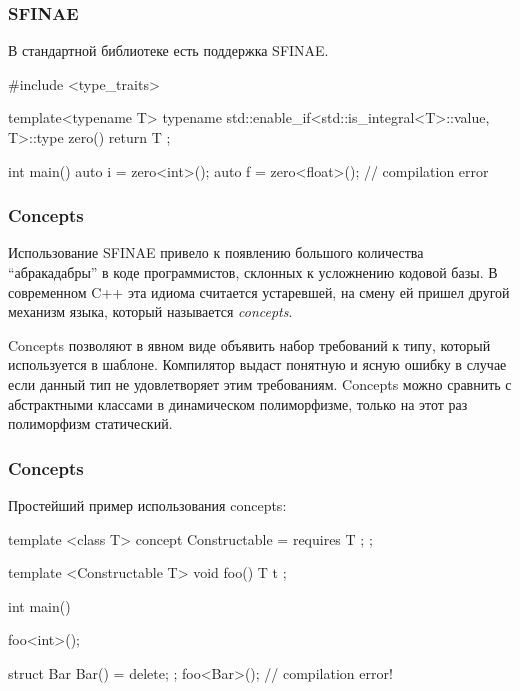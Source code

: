 \documentclass[compress, 8pt, aspectratio=169]{beamer}
\begin{document}
  \begin{frame}[fragile]

    \frametitle{SFINAE}

    В стандартной библиотеке есть поддержка\footnotemark{} SFINAE.


    \begin{myinplacelisting}[minted language=cpp]
#include <type_traits>

template<typename T>
typename std::enable_if<std::is_integral<T>::value, T>::type
zero() {
    return T {};
}

int main() {
    auto i = zero<int>();
    auto f = zero<float>(); // compilation error
}
    \end{myinplacelisting}

  \end{frame}

  \begin{frame}[fragile]

    \frametitle{Concepts}

    Использование SFINAE привело к появлению большого
    количества \enquote{абракадабры} в коде программистов,
    склонных к усложнению кодовой базы.
    В современном C++ эта идиома считается устаревшей,
    на смену ей пришел другой механизм языка, который
    называется \textit{concepts}\footnotemark{}.


    \hfill \break
    Concepts позволяют в явном виде объявить набор требований к типу,
    который используется в шаблоне.
    Компилятор выдаст понятную и ясную ошибку в случае если данный тип
    не удовлетворяет этим требованиям.
    Concepts можно сравнить с абстрактными классами в динамическом полиморфизме,
    только на этот раз полиморфизм статический.

  \end{frame}

  \begin{frame}[fragile]

    \frametitle{Concepts}

    Простейший пример использования concepts:

    \begin{myinplacelisting}[minted language=cpp]
template <class T>
concept Constructable = requires {
    T {};
};

template <Constructable T>
void foo() {
    T t {};
}

int main() {
    foo<int>();

    struct Bar { Bar() = delete; };
    foo<Bar>(); // compilation error!
}
    \end{myinplacelisting}

  \end{frame}
\end{document}
